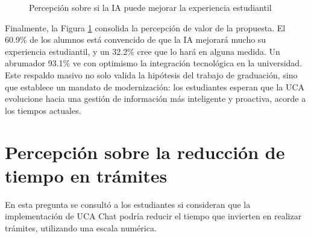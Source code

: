 {{\begin{figure}[H]
    \centering
    \caption{Percepción sobre si la IA puede mejorar la experiencia estudiantil}
    \label{fig:ia_mejora_experiencia}
\end{figure}

Finalmente, la Figura \ref{fig:ia_mejora_experiencia} consolida la percepción de valor de la propuesta. El 60.9\% de los alumnos está convencido de que la IA mejorará mucho su experiencia estudiantil, y un 32.2\% cree que lo hará en alguna medida. Un abrumador 93.1\% ve con optimismo la integración tecnológica en la universidad. Este respaldo masivo no solo valida la hipótesis del trabajo de graduación, sino que establece un mandato de modernización: los estudiantes esperan que la UCA evolucione hacia una gestión de información más inteligente y proactiva, acorde a los tiempos actuales.

\section{Percepción sobre la reducción de tiempo en trámites}
En esta pregunta se consultó a los estudiantes si consideran que la implementación de UCA Chat podría reducir el tiempo que invierten en realizar trámites, utilizando una escala numérica.

}}
